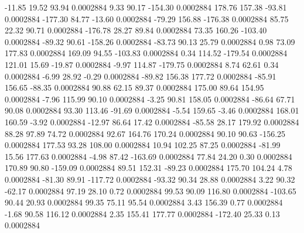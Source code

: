       -11.85       19.52       93.94     0.0002884
        9.33       90.17     -154.30     0.0002884
      178.76      157.38      -93.81     0.0002884
     -177.30       84.77      -13.60     0.0002884
      -79.29      156.88     -176.38     0.0002884
       85.75       22.32       90.71     0.0002884
     -176.78       28.27       89.84     0.0002884
       73.35      160.26     -103.40     0.0002884
      -89.32       90.61     -158.26     0.0002884
      -83.73       90.13       25.79     0.0002884
        0.98       73.09      177.83     0.0002884
      169.09       94.55     -103.83     0.0002884
        0.34      114.52     -179.54     0.0002884
      121.01       15.69      -19.87     0.0002884
       -9.97      114.87     -179.75     0.0002884
        8.74       62.61        0.34     0.0002884
       -6.99       28.92       -0.29     0.0002884
      -89.82      156.38      177.72     0.0002884
      -85.91      156.65      -88.35     0.0002884
       90.88       62.15       89.37     0.0002884
      175.00       89.64      154.95     0.0002884
       -7.96      115.99       90.10     0.0002884
       -3.25       90.81      158.05     0.0002884
      -86.64       67.71       90.08     0.0002884
       93.30      113.46      -91.69     0.0002884
       -5.54      159.65       -3.46     0.0002884
      168.01      160.59       -3.92     0.0002884
      -12.97       86.64       17.42     0.0002884
      -85.58       28.17      179.92     0.0002884
       88.28       97.89       74.72     0.0002884
       92.67      164.76      170.24     0.0002884
       90.10       90.63     -156.25     0.0002884
      177.53       93.28      108.00     0.0002884
       10.94      102.25       87.25     0.0002884
      -81.99       15.56      177.63     0.0002884
       -4.98       87.42     -163.69     0.0002884
       77.84       24.20        0.30     0.0002884
      170.89       90.80     -159.09     0.0002884
       89.51      152.31      -89.23     0.0002884
      175.70      104.24        4.78     0.0002884
      -81.30       89.91     -117.72     0.0002884
      -93.32       90.34       28.88     0.0002884
        3.22       90.32      -62.17     0.0002884
       97.19       28.10        0.72     0.0002884
       99.53       90.09      116.80     0.0002884
     -103.65       90.44       20.93     0.0002884
       99.35       75.11       95.54     0.0002884
        3.43      156.39        0.77     0.0002884
       -1.68       90.58      116.12     0.0002884
        2.35      155.41      177.77     0.0002884
     -172.40       25.33        0.13     0.0002884

